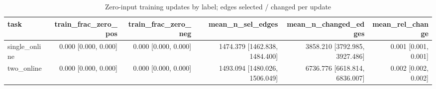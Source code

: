 \begin{table}[t]
\centering
\small
\begin{tabular}{lrrrrr}
\toprule
task & train\_frac\_zero\_pos & train\_frac\_zero\_neg & mean\_n\_sel\_edges & mean\_n\_changed\_edges & mean\_rel\_change \\
\midrule
single\_online & 0.000 [0.000, 0.000] & 0.000 [0.000, 0.000] & 1474.379 [1462.838, 1484.400] & 3858.210 [3792.985, 3927.486] & 0.001 [0.001, 0.001] \\
two\_online & 0.000 [0.000, 0.000] & 0.000 [0.000, 0.000] & 1493.094 [1480.026, 1506.049] & 6736.776 [6618.814, 6836.007] & 0.002 [0.002, 0.002] \\
\bottomrule
\end{tabular}
\caption{Zero-input training updates by label; edges selected / changed per update}
\label{tab:kc_diag_updates}
\end{table}